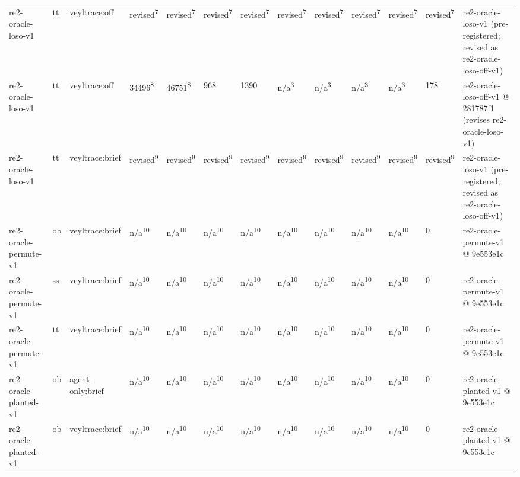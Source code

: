 \begin{table}[t]
\begin{tabular}{lllllllllllll}
re2-oracle-loso-v1 & tt & veyltrace:off & revised\textsuperscript{7} & revised\textsuperscript{7} & revised\textsuperscript{7} & revised\textsuperscript{7} & revised\textsuperscript{7} & revised\textsuperscript{7} & revised\textsuperscript{7} & revised\textsuperscript{7} & revised\textsuperscript{7} & re2-oracle-loso-v1 (pre-registered; revised as re2-oracle-loso-off-v1) \\
re2-oracle-loso-v1 & tt & veyltrace:off & 34496\textsuperscript{8} & 46751\textsuperscript{8} & 968 & 1390 & n/a\textsuperscript{3} & n/a\textsuperscript{3} & n/a\textsuperscript{3} & n/a\textsuperscript{3} & 178 & re2-oracle-loso-off-v1 @ 281787f1 (revises re2-oracle-loso-v1) \\
re2-oracle-loso-v1 & tt & veyltrace:brief & revised\textsuperscript{9} & revised\textsuperscript{9} & revised\textsuperscript{9} & revised\textsuperscript{9} & revised\textsuperscript{9} & revised\textsuperscript{9} & revised\textsuperscript{9} & revised\textsuperscript{9} & revised\textsuperscript{9} & re2-oracle-loso-v1 (pre-registered; revised as re2-oracle-loso-off-v1) \\
re2-oracle-permute-v1 & ob & veyltrace:brief & n/a\textsuperscript{10} & n/a\textsuperscript{10} & n/a\textsuperscript{10} & n/a\textsuperscript{10} & n/a\textsuperscript{10} & n/a\textsuperscript{10} & n/a\textsuperscript{10} & n/a\textsuperscript{10} & 0 & re2-oracle-permute-v1 @ 9e553e1c \\
re2-oracle-permute-v1 & ss & veyltrace:brief & n/a\textsuperscript{10} & n/a\textsuperscript{10} & n/a\textsuperscript{10} & n/a\textsuperscript{10} & n/a\textsuperscript{10} & n/a\textsuperscript{10} & n/a\textsuperscript{10} & n/a\textsuperscript{10} & 0 & re2-oracle-permute-v1 @ 9e553e1c \\
re2-oracle-permute-v1 & tt & veyltrace:brief & n/a\textsuperscript{10} & n/a\textsuperscript{10} & n/a\textsuperscript{10} & n/a\textsuperscript{10} & n/a\textsuperscript{10} & n/a\textsuperscript{10} & n/a\textsuperscript{10} & n/a\textsuperscript{10} & 0 & re2-oracle-permute-v1 @ 9e553e1c \\
re2-oracle-planted-v1 & ob & agent-only:brief & n/a\textsuperscript{10} & n/a\textsuperscript{10} & n/a\textsuperscript{10} & n/a\textsuperscript{10} & n/a\textsuperscript{10} & n/a\textsuperscript{10} & n/a\textsuperscript{10} & n/a\textsuperscript{10} & 0 & re2-oracle-planted-v1 @ 9e553e1c \\
re2-oracle-planted-v1 & ob & veyltrace:brief & n/a\textsuperscript{10} & n/a\textsuperscript{10} & n/a\textsuperscript{10} & n/a\textsuperscript{10} & n/a\textsuperscript{10} & n/a\textsuperscript{10} & n/a\textsuperscript{10} & n/a\textsuperscript{10} & 0 & re2-oracle-planted-v1 @ 9e553e1c \\

\end{tabular}
\end{table}
